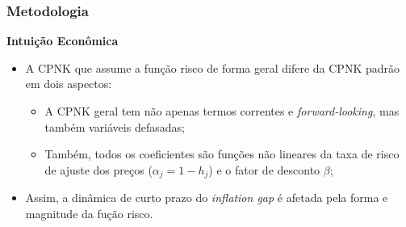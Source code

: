 \documentclass[aspectratio=169]{beamer}
\begin{document}
\begin{frame}\frametitle{Metodologia}
  \textbf{Intuição Econômica}
  \begin{itemize}
  \item A CPNK que assume a função risco de forma geral difere da CPNK padrão em dois aspectos:
    \begin{itemize}
    \item A CPNK geral tem não apenas termos correntes e \emph{forward-looking}, mas também variáveis defasadas;
    \item Também, todos os coeficientes são funções não lineares da taxa de risco de ajuste dos preços ($\alpha_{j}=1-h_{j}$) e o fator de desconto $\beta$;
    \end{itemize}
  \item Assim, a dinâmica de curto prazo do \emph{inflation gap} é afetada pela forma e magnitude da fução risco.
  \end{itemize}
\end{frame}
\end{document}
